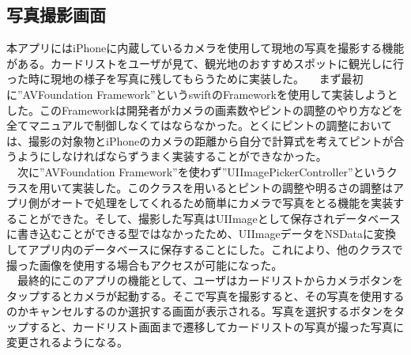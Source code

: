 \subsection{写真撮影画面}
本アプリにはiPhoneに内蔵しているカメラを使用して現地の写真を撮影する機能がある。カードリストをユーザが見て、観光地のおすすめスポットに観光しに行った時に現地の様子を写真に残してもらうために実装した。
　まず最初に”AVFoundation Framework”というswiftのFrameworkを使用して実装しようとした。このFrameworkは開発者がカメラの画素数やピントの調整のやり方などを全てマニュアルで制御しなくてはならなかった。とくにピントの調整においては、撮影の対象物とiPhoneのカメラの距離から自分で計算式を考えてピントが合うようにしなければならずうまく実装することができなかった。\\
　次に”AVFoundation Framework”を使わず”UIImagePickerController”というクラスを用いて実装した。このクラスを用いるとピントの調整や明るさの調整はアプリ側がオートで処理をしてくれるため簡単にカメラで写真をとる機能を実装することができた。そして、撮影した写真はUIImageとして保存されデータベースに書き込むことができる型ではなかったため、UIImageデータをNSDataに変換してアプリ内のデータベースに保存することにした。これにより、他のクラスで撮った画像を使用する場合もアクセスが可能になった。\\
　最終的にこのアプリの機能として、ユーザはカードリストからカメラボタンをタップするとカメラが起動する。そこで写真を撮影すると、その写真を使用するのかキャンセルするのか選択する画面が表示される。写真を選択するボタンをタップすると、カードリスト画面まで遷移してカードリストの写真が撮った写真に変更されるようになる。

